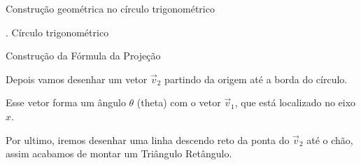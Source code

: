 \documentclass{beamer}
\begin{document}
\begin{frame}{Construção geométrica no círculo trigonométrico}

\centering


\vspace{0.5cm}

. Círculo trigonométrico

\end{frame}
\begin{frame}{Construção da Fórmula da Projeção}


\vspace{0.7cm}

Depois vamos desenhar um vetor $\vec{v}_2$ partindo da origem até a borda do círculo.

\vspace{0.4cm}

Esse vetor forma um ângulo $\theta$ (theta) com o vetor $\vec{v}_1$, que está localizado no eixo $x$.

\vspace{0.4cm}
Por ultimo, iremos desenhar uma linha descendo reto da ponta do $\vec{v}_2$ até o chão, assim acabamos de montar um Triângulo Retângulo.
\vspace{0.4cm}

\end{frame}
\end{document}
